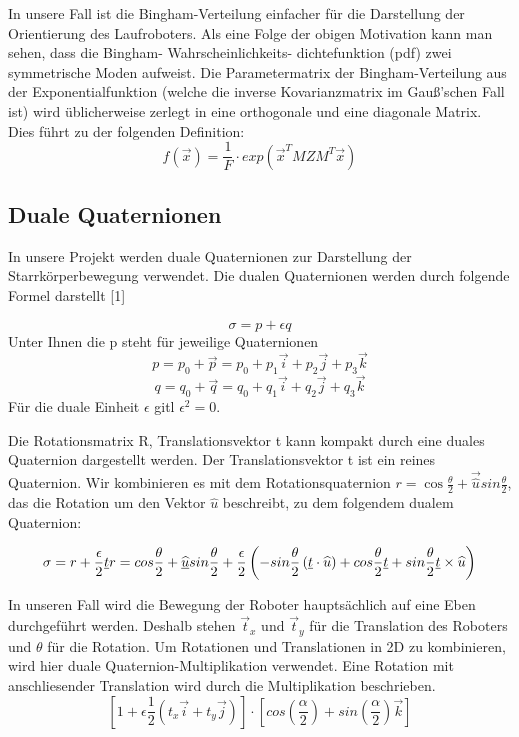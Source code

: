 In unsere Fall ist die Bingham-Verteilung einfacher für die Darstellung der Orientierung des Laufroboters. Als eine Folge der obigen Motivation kann man sehen, dass die Bingham- Wahrscheinlichkeits- dichtefunktion (pdf) zwei symmetrische Moden aufweist. Die Parametermatrix der Bingham-Verteilung aus der Exponentialfunktion  (welche die inverse  Kovarianzmatrix im Gauß'schen Fall ist) wird üblicherweise zerlegt in eine orthogonale und eine diagonale Matrix. Dies führt zu der folgenden Definition:
\begin{equation}
	f\left(\vec{x}\right)=\frac{1}{F}\cdot exp\left(\vec{x}^{T}MZM^{T}\vec{x}\right)
\end{equation}




\subsection{Duale Quaternionen}
In unsere Projekt werden duale Quaternionen zur Darstellung der Starrkörperbewegung verwendet. Die dualen Quaternionen werden durch folgende Formel darstellt [1]

\begin{equation}
\sigma=p+\epsilon q
\end{equation}
Unter Ihnen die p steht für jeweilige Quaternionen
\begin{equation}
	p=p_{0}+\vec{p}=p_{0}+p_{1}\vec{i}+p_{2}\vec{j}+p_{3}\vec{k}
\end{equation}
\begin{equation}
	q=q_{0}+\vec{q}=q_{0}+q_{1}\vec{i}+q_{2}\vec{j}+q_{3}\vec{k}
\end{equation}
Für die duale Einheit $\epsilon$ gitl $\epsilon^2 = 0$.

Die Rotationsmatrix R, Translationsvektor t kann kompakt durch eine duales Quaternion dargestellt werden. Der Translationsvektor t ist ein reines Quaternion. Wir kombinieren es mit dem Rotationsquaternion $r =\cos\frac{\theta}{2}+ \vec{\widehat{u}}sin\frac{\theta}{2}$, das die Rotation um den Vektor $\widehat{u}$ beschreibt, zu dem folgendem dualem Quaternion:

\begin{equation}
	\sigma = r + \frac{\epsilon}{2}\vec{t}r\\
	=cos\frac{\theta}{2}+ \vec{\widehat{u}}sin\frac{\theta}{2} + \frac{\epsilon}{2}\left( -sin\frac{\theta}{2}\left(\vec{t}\cdot\widehat{u} \right)+ cos\frac{\theta}{2} \vec{t}+sin\frac{\theta}{2} \vec{t} \times \widehat{u} \right) 
\end{equation}

In unseren Fall wird die Bewegung der Roboter hauptsächlich auf eine Eben durchgeführt werden. Deshalb stehen $\vec{t}_{x}$ und $\vec{t}_{y}$ für die Translation des Roboters und $\theta$ für die Rotation. Um Rotationen und Translationen in 2D zu kombinieren, wird hier
duale Quaternion-Multiplikation verwendet. Eine Rotation mit anschliesender Translation wird durch die Multiplikation beschrieben.
\begin{equation}
	\left[1+\epsilon\frac{1}{2}\left(t_{x}\vec{i}+t_{y}\vec{j}\right) \right] \cdot\left[cos\left( \frac{\alpha}{2}\right)+sin\left(\frac{\alpha}{2}\right)\vec{k}\right]
\end{equation}
